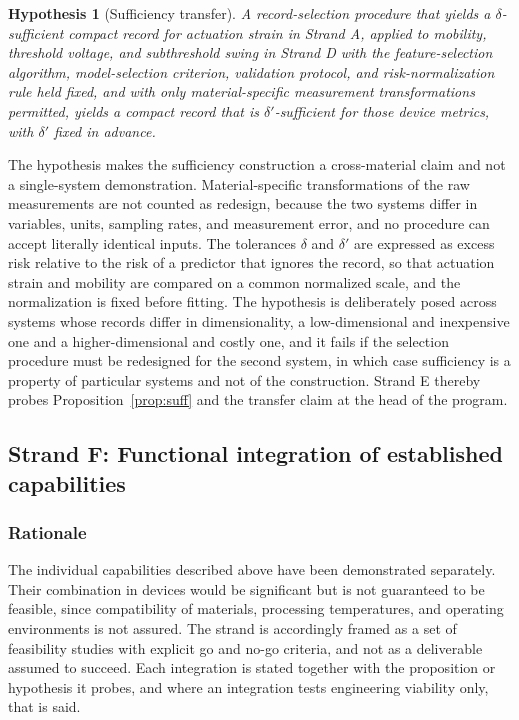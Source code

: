 \documentclass[11pt]{article}
\newtheorem{hypothesis}{Hypothesis}
\theoremstyle{definition}
\begin{document}
\begin{hypothesis}[Sufficiency transfer]
\label{hyp:suftransfer}
A record-selection procedure that yields a $\delta$-sufficient compact record for actuation strain in Strand A, applied to mobility, threshold voltage, and subthreshold swing in Strand D with the feature-selection algorithm, model-selection criterion, validation protocol, and risk-normalization rule held fixed, and with only material-specific measurement transformations permitted, yields a compact record that is $\delta'$-sufficient for those device metrics, with $\delta'$ fixed in advance.
\end{hypothesis}

The hypothesis makes the sufficiency construction a cross-material claim and not a single-system demonstration. Material-specific transformations of the raw measurements are not counted as redesign, because the two systems differ in variables, units, sampling rates, and measurement error, and no procedure can accept literally identical inputs. The tolerances $\delta$ and $\delta'$ are expressed as excess risk relative to the risk of a predictor that ignores the record, so that actuation strain and mobility are compared on a common normalized scale, and the normalization is fixed before fitting. The hypothesis is deliberately posed across systems whose records differ in dimensionality, a low-dimensional and inexpensive one and a higher-dimensional and costly one, and it fails if the selection procedure must be redesigned for the second system, in which case sufficiency is a property of particular systems and not of the construction. Strand E thereby probes Proposition~\ref{prop:suff} and the transfer claim at the head of the program.

\subsection{Strand F: Functional integration of established capabilities}

\subsubsection*{Rationale}

The individual capabilities described above have been demonstrated separately. Their combination in devices would be significant but is not guaranteed to be feasible, since compatibility of materials, processing temperatures, and operating environments is not assured. The strand is accordingly framed as a set of feasibility studies with explicit go and no-go criteria, and not as a deliverable assumed to succeed. Each integration is stated together with the proposition or hypothesis it probes, and where an integration tests engineering viability only, that is said.
\end{document}
